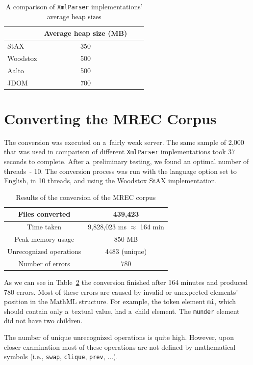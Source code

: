 \documentclass[11pt,oneside,final]{fithesis2}
\def\s#1{#1\index{#1}}
\begin{document}
\begin{table}[!ht]
\centering
\begin{tabular}{|l|c|c|c|}
\hline
& Average heap size (MB) \\ \hline
\hline
StAX & 350 \\ \hline
Woodstox & 500 \\ \hline
Aalto & 500 \\ \hline
JDOM & 700 \\ \hline
\end{tabular}
\caption{A comparison of \texttt{XmlParser} implementations' average heap sizes}
\label{table:averageheap}
\end{table}

\section{Converting the MREC Corpus}
The \s{conversion} was executed on a~fairly weak server. The same sample of 2,000 that was used in comparison of different \texttt{XmlParser} implementations took 37 seconds to complete. After a~preliminary testing, we found an optimal number of threads~- 10. The conversion process was run with the language option set to English, in 10 threads, and using the Woodstox StAX implementation.

\begin{table}[!ht]
\centering
\begin{tabular}{|c|c|}
\hline
Files converted & 439,423 \\ \hline
Time taken & 9,828,023 ms $\approx$ 164 min \\ \hline
Peak memory usage & 850 MB \\ \hline
Unrecognized operations & 4483 (unique) \\ \hline
Number of errors & 780 \\ \hline
\end{tabular}
\caption{Results of the conversion of the MREC corpus}
\label{table:mrecresults}
\end{table}

As we can see in Table~\ref{table:mrecresults} the conversion finished after 164 minutes and produced 780 errors. Most of these errors are caused by invalid or unexpected elements' position in the MathML structure. For example, the token element \texttt{mi}, which should contain only a~textual value, had a~child element. The \texttt{munder} element did not have two children.

The number of unique unrecognized operations is quite high. However, upon closer examination most of these operations are not defined by mathematical symbols (i.e., \texttt{swap}, \texttt{clique}, \texttt{prev}, $\ldots$). 
\end{document}
